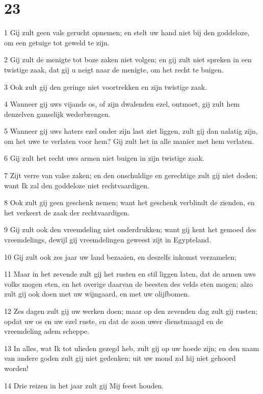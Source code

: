 \chapter{23}

\par 1 Gij zult geen vals gerucht opnemen; en stelt uw hand niet bij den goddeloze, om een getuige tot geweld te zijn.
\par 2 Gij zult de menigte tot boze zaken niet volgen; en gij zult niet spreken in een twistige zaak, dat gij u neigt naar de menigte, om het recht te buigen.
\par 3 Ook zult gij den geringe niet voortrekken en zijn twistige zaak.
\par 4 Wanneer gij uws vijands os, of zijn dwalenden ezel, ontmoet, gij zult hem denzelven ganselijk wederbrengen.
\par 5 Wanneer gij uws haters ezel onder zijn last ziet liggen, zult gij dan nalatig zijn, om het uwe te verlaten voor hem? Gij zult het in alle manier met hem verlaten.
\par 6 Gij zult het recht uws armen niet buigen in zijn twistige zaak.
\par 7 Zijt verre van valse zaken; en den onschuldige en gerechtige zult gij niet doden; want Ik zal den goddeloze niet rechtvaardigen.
\par 8 Ook zult gij geen geschenk nemen; want het geschenk verblindt de zienden, en het verkeert de zaak der rechtvaardigen.
\par 9 Gij zult ook den vreemdeling niet onderdrukken; want gij kent het gemoed des vreemdelings, dewijl gij vreemdelingen geweest zijt in Egypteland.
\par 10 Gij zult ook zes jaar uw land bezaaien, en deszelfs inkomst verzamelen;
\par 11 Maar in het zevende zult gij het rusten en stil liggen laten, dat de armen uws volks mogen eten, en het overige daarvan de beesten des velds eten mogen; alzo zult gij ook doen met uw wijngaard, en met uw olijfbomen.
\par 12 Zes dagen zult gij uw werken doen; maar op den zevenden dag zult gij rusten; opdat uw os en uw ezel ruste, en dat de zoon uwer dienstmaagd en de vreemdeling adem scheppe.
\par 13 In alles, wat Ik tot ulieden gezegd heb, zult gij op uw hoede zijn; en den naam van andere goden zult gij niet gedenken; uit uw mond zal hij niet gehoord worden!
\par 14 Drie reizen in het jaar zult gij Mij feest houden.
